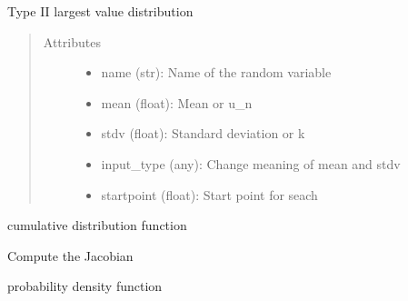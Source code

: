 \documentclass[letterpaper,10pt,english]{sphinxmanual}
\begin{document}
\begin{fulllineitems}
Type II largest value distribution
\begin{quote}\begin{description}
\item[{Attributes }] \leavevmode\begin{itemize}
\item {} 
name (str):   Name of the random variable

\item {} 
mean (float): Mean or u\_n

\item {} 
stdv (float): Standard deviation or k

\item {} 
input\_type (any): Change meaning of mean and stdv

\item {} 
startpoint (float): Start point for seach

\end{itemize}

\end{description}\end{quote}


\begin{fulllineitems}
cumulative distribution function

\end{fulllineitems}



\begin{fulllineitems}
Compute the Jacobian

\end{fulllineitems}



\begin{fulllineitems}
probability density function

\end{fulllineitems}




\end{fulllineitems}
\end{document}
